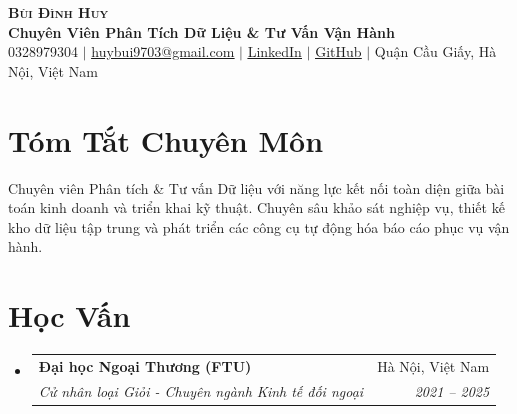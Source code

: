 \documentclass[letterpaper,11pt]{article}
\makeatletter
\newcommand{\resumeSubheading}[4]{
  \vspace{2pt}\item
    \begin{tabular*}{\textwidth}[t]{l@{\extracolsep{\fill}}r}
      \textbf{#1} & #2 \\
      \textit{\small#3} & \textit{\small #4} \\
    \end{tabular*}\vspace{-2pt}
}
\newcommand{\resumeSubHeadingListStart}{\begin{itemize}[leftmargin=0.15in, label={}]}
\newcommand{\resumeSubHeadingListEnd}{\end{itemize}}
\makeatother
\begin{document}
\begin{center}
    \textbf{\Huge \scshape Bùi Đình Huy} \\ \vspace{3pt}
    \small \textbf{\color{NavyBlue} Chuyên Viên Phân Tích Dữ Liệu \& Tư Vấn Vận Hành} \\ \vspace{4pt}
    \small 0328979304 $|$ \href{mailto:huybui9703@gmail.com}{\underline{huybui9703@gmail.com}} $|$ 
    \href{https://www.linkedin.com/in/dinh-huy-bui/}{\underline{LinkedIn}} $|$
    \href{https://github.com/dewey97}{\underline{GitHub}} $|$
    Quận Cầu Giấy, Hà Nội, Việt Nam
\end{center}

\vspace{2pt}

\section*{Tóm Tắt Chuyên Môn}
\small{Chuyên viên Phân tích \& Tư vấn Dữ liệu với năng lực kết nối toàn diện giữa bài toán kinh doanh và triển khai kỹ thuật. Chuyên sâu khảo sát nghiệp vụ, thiết kế kho dữ liệu tập trung và phát triển các công cụ tự động hóa báo cáo phục vụ vận hành.}

\section*{Học Vấn}
  \resumeSubHeadingListStart
    \resumeSubheading
      {Đại học Ngoại Thương (FTU)}{Hà Nội, Việt Nam}
      {Cử nhân loại Giỏi - Chuyên ngành Kinh tế đối ngoại}{2021 -- 2025}
  \resumeSubHeadingListEnd

\end{document}
